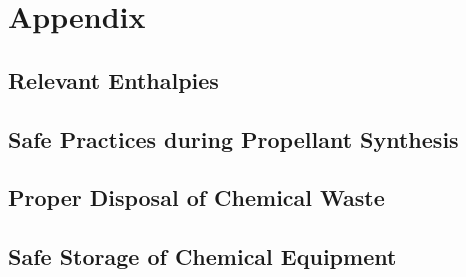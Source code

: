 \section{Appendix}
	\subsection{Relevant Enthalpies}
		\lipsum[1-2]
	\subsection{Safe Practices during Propellant Synthesis}
		\lipsum[1-3]
	\subsection{Proper Disposal of Chemical Waste}
		\lipsum[1-2]
	\subsection{Safe Storage of Chemical Equipment}
		\lipsum[1-2]